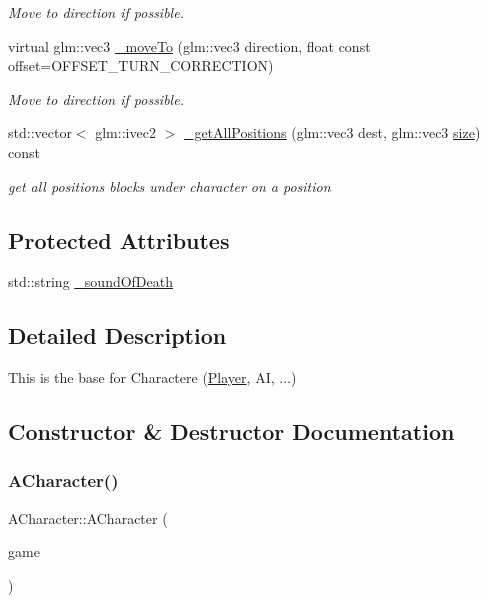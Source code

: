 \begin{DoxyCompactItemize}
\begin{DoxyCompactList}\small\item\em Move to direction if possible. \end{DoxyCompactList}\item 
virtual glm\+::vec3 \hyperlink{class_a_character_a1a85eefb6e443e0e8a49ffb8e683659d}{\+\_\+move\+To} (glm\+::vec3 direction, float const offset=O\+F\+F\+S\+E\+T\+\_\+\+T\+U\+R\+N\+\_\+\+C\+O\+R\+R\+E\+C\+T\+I\+ON)
\begin{DoxyCompactList}\small\item\em Move to direction if possible. \end{DoxyCompactList}\item 
std\+::vector$<$ glm\+::ivec2 $>$ \hyperlink{class_a_character_ac90c6aeec198c760cba165860a67f622}{\+\_\+get\+All\+Positions} (glm\+::vec3 dest, glm\+::vec3 \hyperlink{class_a_entity_a47f976f25e6214669d64fb2bbb2c455a}{size}) const
\begin{DoxyCompactList}\small\item\em get all positions blocks under character on a position \end{DoxyCompactList}\end{DoxyCompactItemize}
\subsection*{Protected Attributes}
\begin{DoxyCompactItemize}
\item 
std\+::string \hyperlink{class_a_character_a5af6eac92ea7539809748b6f9e4be83b}{\+\_\+sound\+Of\+Death}
\end{DoxyCompactItemize}


\subsection{Detailed Description}
This is the base for Charactere (\hyperlink{class_player}{Player}, AI, ...) 

\subsection{Constructor \& Destructor Documentation}
\mbox{\label{class_a_character_a110d0c6cd4cb1803d749e8638218790a}} 
\subsubsection{\texorpdfstring{A\+Character()}{ACharacter()}\hspace{0.1cm}{\footnotesize\ttfamily [1/2]}}
{\footnotesize\ttfamily A\+Character\+::\+A\+Character (\begin{DoxyParamCaption}\item[{\hyperlink{class_scene_game}{Scene\+Game} \&}]{game }\end{DoxyParamCaption})\hspace{0.3cm}{\ttfamily [explicit]}}



